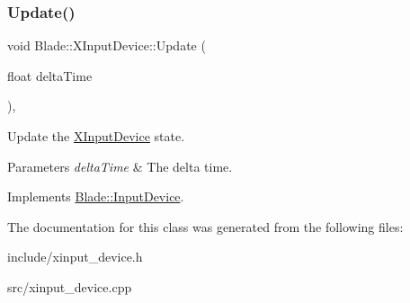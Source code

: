 \subsubsection{\texorpdfstring{Update()}{Update()}}
{\footnotesize\ttfamily void Blade\+::\+X\+Input\+Device\+::\+Update (\begin{DoxyParamCaption}\item[{float}]{delta\+Time }\end{DoxyParamCaption})\hspace{0.3cm}{\ttfamily [override]}, {\ttfamily [virtual]}}



Update the \hyperlink{class_blade_1_1_x_input_device}{X\+Input\+Device} state. 


\begin{DoxyParams}{Parameters}
{\em delta\+Time} & The delta time. \\
\hline
\end{DoxyParams}


Implements \hyperlink{class_blade_1_1_input_device_a6c0b653604f7c2a4840116c9e893b3e5}{Blade\+::\+Input\+Device}.



The documentation for this class was generated from the following files\+:\begin{DoxyCompactItemize}
\item 
include/xinput\+\_\+device.\+h\item 
src/xinput\+\_\+device.\+cpp\end{DoxyCompactItemize}
